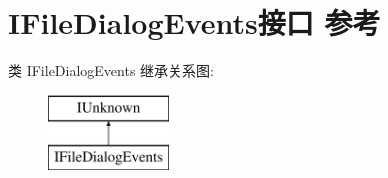 \hypertarget{interface_i_file_dialog_events}{}\section{I\+File\+Dialog\+Events接口 参考}
\label{interface_i_file_dialog_events}
类 I\+File\+Dialog\+Events 继承关系图\+:\begin{figure}[H]
\begin{center}
\leavevmode
\includegraphics[height=2.000000cm]{interface_i_file_dialog_events}
\end{center}
\end{figure}
